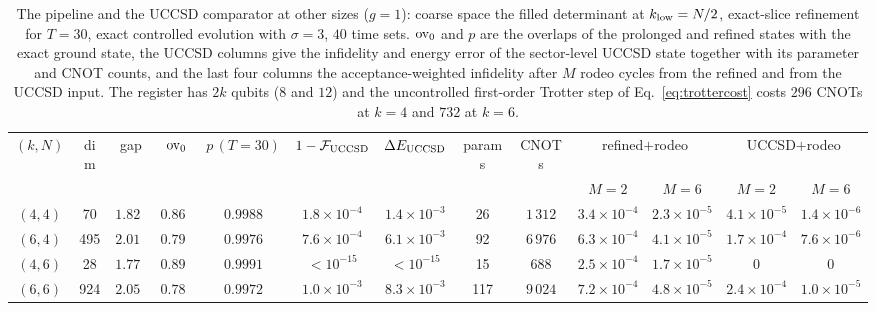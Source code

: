 \documentclass[
  aps,            %
  prc,            %
  reprint,        %
  superscriptaddress,
  floatfix,
  nofootinbib
]{revtex4-2}
\begin{document}
\begin{table}[t]
\caption{\label{tab:sizes}The pipeline and the UCCSD comparator at other
sizes ($g=1$): coarse space the filled determinant at $k_{\rm low}=N/2$,
exact-slice refinement for $T=30$, exact controlled evolution with $\sigma=3$,
$40$ time sets.  ${\rm ov}_0$ and $p$ are the overlaps of the prolonged and
refined states with the exact ground state, the UCCSD columns give the
infidelity and energy error of the sector-level UCCSD state together with its
parameter and CNOT counts, and the last four columns the acceptance-weighted
infidelity after $M$ rodeo cycles from the refined and from the UCCSD input.
The register has $2k$ qubits ($8$ and $12$) and the uncontrolled first-order
Trotter step of Eq.~\eqref{eq:trottercost} costs $296$ CNOTs at $k=4$ and
$732$ at $k=6$.}
\footnotesize
\begin{ruledtabular}
\begin{tabular}{ccc cc cccc cc cc}
$(k,N)$ & dim & gap & ${\rm ov}_0$ & $p\,(T{=}30)$ & $1-\mathcal F_{\rm UCCSD}$ & $\Delta E_{\rm UCCSD}$ & params & CNOTs & \multicolumn{2}{c}{refined$+$rodeo} & \multicolumn{2}{c}{UCCSD$+$rodeo}\\
 & & & & & & & & & $M{=}2$ & $M{=}6$ & $M{=}2$ & $M{=}6$\\
\colrule
$(4,4)$ & 70  & $1.823$ & $0.868$ & $0.9988$ & $1.8\times10^{-4}$ & $1.4\times10^{-3}$ & 26  & $1\,312$ & $3.4\times10^{-4}$ & $2.3\times10^{-5}$ & $4.1\times10^{-5}$ & $1.4\times10^{-6}$\\
$(6,4)$ & 495 & $2.017$ & $0.798$ & $0.9976$ & $7.6\times10^{-4}$ & $6.1\times10^{-3}$ & 92  & $6\,976$ & $6.3\times10^{-4}$ & $4.1\times10^{-5}$ & $1.7\times10^{-4}$ & $7.6\times10^{-6}$\\
$(4,6)$ & 28  & $1.779$ & $0.894$ & $0.9991$ & $<10^{-15}$ & $<10^{-15}$ & 15  & $688$    & $2.5\times10^{-4}$ & $1.7\times10^{-5}$ & $0$ & $0$\\
$(6,6)$ & 924 & $2.052$ & $0.780$ & $0.9972$ & $1.0\times10^{-3}$ & $8.3\times10^{-3}$ & 117 & $9\,024$ & $7.2\times10^{-4}$ & $4.8\times10^{-5}$ & $2.4\times10^{-4}$ & $1.0\times10^{-5}$\\
\end{tabular}
\end{ruledtabular}
\end{table}
\end{document}
